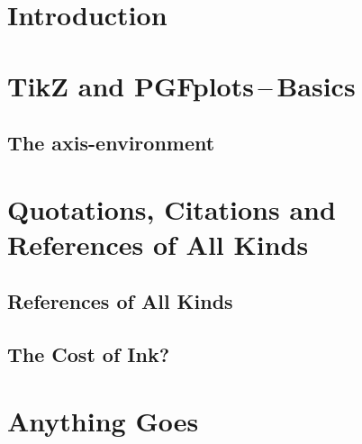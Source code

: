 \documentclass[%
twoside,symmetric,	%
nols, %
a4paper, %
notoc,	%
justified,	%
nobib, %
]{tufte-book} %
\begin{document}
	
	
	
	
	
	\sffamily %
	\tableofcontents
	\normalfont %
	\cleardoublepage
	
	\pagestyle{mystyle}	
	\setcounter{page}{1}
	
	\chapter{Introduction}\label{sec:introduction}
		
		
	\chapter{TikZ and PGFplots\,--\,Basics}
		\section{The axis-environment}
			

	\chapter[Quotes \& References]{Quotations, Citations and \\ References of All Kinds}
		
		\section[References]{References of All Kinds}
		
		\section[The Cost of Ink?]{The Cost of Ink?}
			
	\chapter[Anything Goes]{Anything Goes}
		
			
	
	\cleardoublepage %
	
	
	\cleardoublepage
	\printindex
\end{document}
